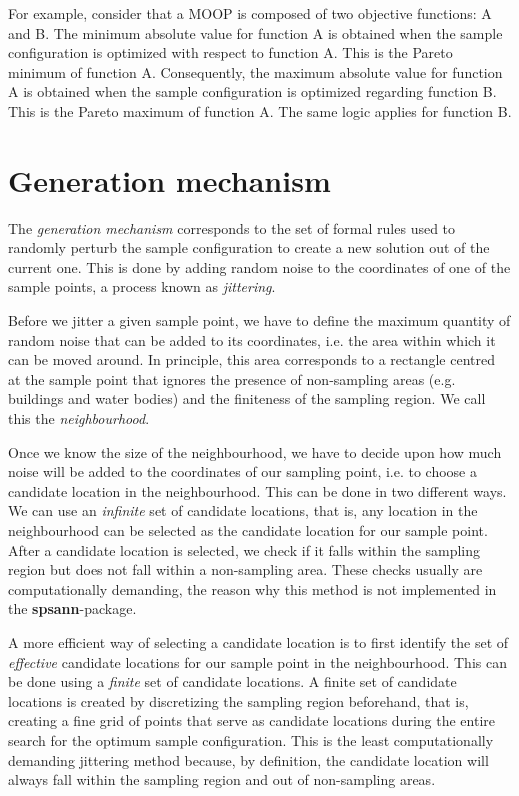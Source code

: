 For example, consider that a MOOP is composed of two objective functions: A 
and B. The minimum absolute value for function A is obtained when the sample
configuration is optimized with respect to function A. This is the Pareto
minimum of function A. Consequently, the maximum absolute value for function
A is obtained when the sample configuration is optimized regarding function
B. This is the Pareto maximum of function A. The same logic applies for 
function B.

\section{Generation mechanism}

The \textit{generation mechanism} corresponds to the set of formal rules used 
to randomly perturb the sample conﬁguration to create a new solution out of the
current one. This is done by adding random noise to the coordinates of one of 
the sample points, a process known as \textit{jittering}.

Before we jitter a given sample point, we have to define the maximum quantity 
of random noise that can be added to its coordinates, i.e. the area within 
which it can be moved around. In principle, this area corresponds to a rectangle
centred at the sample point that ignores the presence of non-sampling areas 
(e.g. buildings and water bodies) and the finiteness of the sampling region. We 
call this the \textit{neighbourhood}.

Once we know the size of the neighbourhood, we have to decide upon how much 
noise will be added to the coordinates of our sampling point, i.e. to choose a
candidate location in the neighbourhood. This can be done in two different ways.
We can use an \textit{infinite} set of candidate locations, that is, any 
location in the neighbourhood can be selected as the candidate location for our 
sample point. After a candidate location is selected, we check if it falls 
within the sampling region but does not fall within a non-sampling area. These 
checks usually are computationally demanding, the reason why this method is not 
implemented in the \textbf{spsann}-package.

A more efficient way of selecting a candidate location is to first identify the
set of \textit{effective} candidate locations for our sample point in the 
neighbourhood. This can be done using a \textit{finite} set of candidate 
locations. A finite set of candidate locations is created by discretizing the 
sampling region beforehand, that is, creating a fine grid of points that serve 
as candidate locations during the entire search for the optimum sample 
configuration. This is the least computationally demanding jittering method 
because, by definition, the candidate location will always fall within the 
sampling region and out of non-sampling areas.

